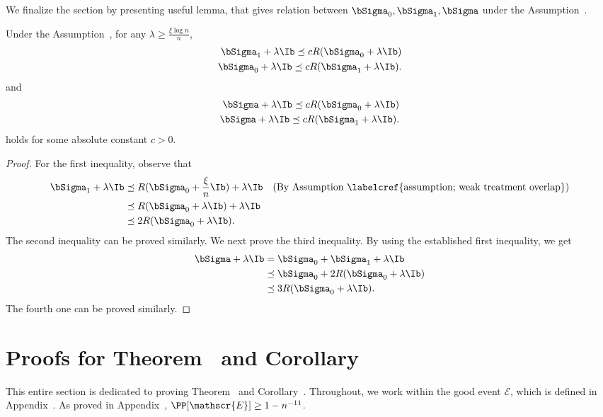\documentclass[12pt,a4paper,pdftex,onepage]{article}
\newcommand{\Sigmatreated}{\bSigma_{1}}
\newcommand{\Sigmacontrol}{\bSigma_{0}}
\newcommand{\event}{\mathscr{E}}
\begin{document}
We finalize the section by presenting useful lemma, that gives relation between \(\Sigmacontrol, \Sigmatreated, \bSigma\) under the Assumption~.
\begin{lemma}\label{lemma; second moment relation under weak overlap}
Under the Assumption~, for any \(\lambda \geq \frac{\xi \log n}{n}\),
\begin{align*}
\Sigmatreated +\lambda \Ib \preceq c R (\Sigmacontrol +\lambda \Ib) \\
\Sigmacontrol +\lambda \Ib \preceq c R (\Sigmatreated +\lambda \Ib).
\end{align*}
and 
\begin{align*}
\bSigma +\lambda \Ib \preceq c R (\Sigmacontrol +\lambda \Ib) \\
\bSigma +\lambda \Ib \preceq c R (\Sigmatreated +\lambda \Ib).
\end{align*}
holds for some absolute constant \(c>0\).
\end{lemma}

\begin{proof}
For the first inequality, observe that 
\begin{align*}
\Sigmatreated +\lambda \Ib &\preceq R(\Sigmacontrol+ \frac{\xi}{n} \Ib) + \lambda \Ib \quad \text{(By Assumption~\labelcref{assumption; weak treatment overlap})} \\
&\preceq R(\Sigmacontrol+ \lambda  \Ib) + \lambda \Ib \\
&\preceq 2R(\Sigmacontrol+ \lambda  \Ib).
\end{align*} 
The second inequality can be proved similarly.
We next prove the third inequality.
By using the established first inequality, we get
\begin{align*}
\bSigma +\lambda \Ib &= \Sigmacontrol + \Sigmatreated + \lambda \Ib \\
&\preceq \Sigmacontrol + 2R(\Sigmacontrol +\lambda \Ib)  \\
&\preceq 3R(\Sigmacontrol +\lambda \Ib).
\end{align*}
The fourth one can be proved similarly.
\end{proof}



\section{Proofs for Theorem~ and Corollary~} \label{section; proof RA learner}
\noindent
This entire section is dedicated to proving Theorem~ and Corollary~.
Throughout, we work within the good event \(\event\), which is defined in Appendix~.
As proved in Appendix~, \(\PP[\event] \geq 1 - n^{-11}\).
\end{document}
